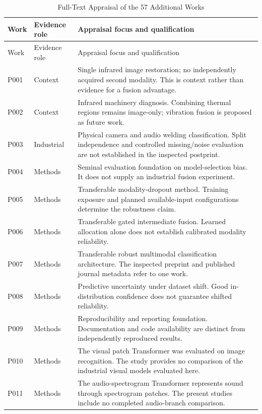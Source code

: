 \begingroup\small
\begin{longtable}{@{}P{.25\textwidth}P{.16\textwidth}P{.53\textwidth}@{}}
\caption{Full-Text Appraisal of the 57 Additional Works}\label{tab:expanded-register}\\
\toprule Work & Evidence role & Appraisal focus and qualification \\
\midrule\endfirsthead
\toprule Work & Evidence role & Appraisal focus and qualification \\
\midrule\endhead
P001 \citep{P001} & Context & Single infrared image restoration; no independently acquired second modality. This is context rather than evidence for a fusion advantage. \\
P002 \citep{P002} & Context & Infrared machinery diagnosis. Combining thermal regions remains image-only; vibration fusion is proposed as future work. \\
P003 \citep{P003} & Industrial & Physical camera and audio welding classification. Split independence and controlled missing/noise evaluation are not established in the inspected postprint. \\
P004 \citep{P004} & Methods & Seminal evaluation foundation on model-selection bias. It does not supply an industrial fusion experiment. \\
P005 \citep{P005} & Methods & Transferable modality-dropout method. Training exposure and planned available-input configurations determine the robustness claim. \\
P006 \citep{P006} & Methods & Transferable gated intermediate fusion. Learned allocation alone does not establish calibrated modality reliability. \\
P007 \citep{P007} & Methods & Transferable robust multimodal classification architecture. The inspected preprint and published journal metadata refer to one work. \\
P008 \citep{P008} & Methods & Predictive uncertainty under dataset shift. Good in-distribution confidence does not guarantee shifted reliability. \\
P009 \citep{P009} & Methods & Reproducibility and reporting foundation. Documentation and code availability are distinct from independently reproduced results. \\
P010 \citep{P010} & Methods & The visual patch Transformer was evaluated on image recognition. The study provides no comparison of the industrial visual models evaluated here. \\
P011 \citep{P011} & Methods & The audio-spectrogram Transformer represents sound through spectrogram patches. The present studies include no completed audio-branch comparison. \\

\end{longtable}
